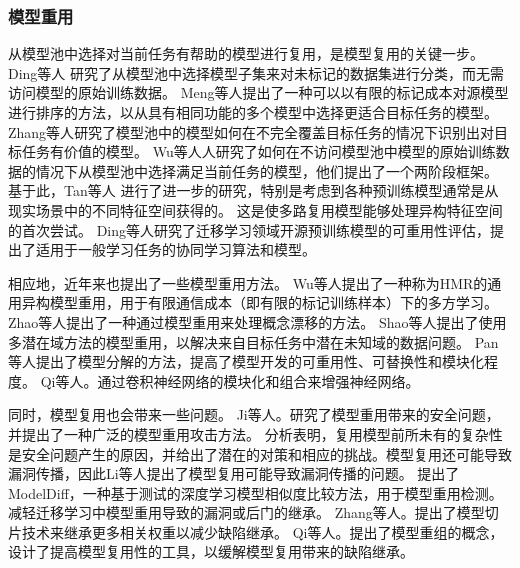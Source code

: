 \documentclass[fontset=macnew,UTF8]{article} %
\begin{document}
\subsubsection{模型重用}
 从模型池中选择对当前任务有帮助的模型进行复用，是模型复用的关键一步。 Ding等人\cite{ding2020boosting} 研究了从模型池中选择模型子集来对未标记的数据集进行分类，而无需访问模型的原始训练数据。 Meng等人\cite{meng2021measuring}提出了一种可以以有限的标记成本对源模型进行排序的方法，以从具有相同功能的多个模型中选择更适合目标任务的模型。Zhang等人\cite{zhang2021towards}研究了模型池中的模型如何在不完全覆盖目标任务的情况下识别出对目标任务有价值的模型。 Wu等人\cite{wu2021model}人研究了如何在不访问模型池中模型的原始训练数据的情况下从模型池中选择满足当前任务的模型，他们提出了一个两阶段框架。 基于此，Tan等人\cite{tan2022towards} 进行了进一步的研究，特别是考虑到各种预训练模型通常是从现实场景中的不同特征空间获得的。 这是使多路复用模型能够处理异构特征空间的首次尝试。 Ding等人\cite{ding2022pre}研究了迁移学习领域开源预训练模型的可重用性评估，提出了适用于一般学习任务的协同学习算法和模型。

相应地，近年来也提出了一些模型重用方法。 Wu等人\cite{wu2019heterogeneous}提出了一种称为HMR的通用异构模型重用，用于有限通信成本（即有限的标记训练样本）下的多方学习。 Zhao等人\cite{zhao2020handling}提出了一种通过模型重用来处理概念漂移的方法。 Shao等人\cite{shao2021towards}提出了使用多潜在域方法的模型重用，以解决来自目标任务中潜在未知域的数据问题。 Pan等人\cite{pan2022decomposing}提出了模型分解的方法，提高了模型开发的可重用性、可替换性和模块化程度。 Qi等人\cite{qi2022patching}。通过卷积神经网络的模块化和组合来增强神经网络。

同时，模型复用也会带来一些问题。 Ji等人\cite{ji2018model}。研究了模型重用带来的安全问题，并提出了一种广泛的模型重用攻击方法。 分析表明，复用模型前所未有的复杂性是安全问题产生的原因，并给出了潜在的对策和相应的挑战。模型复用还可能导致漏洞传播，因此Li等人提出了模型复用可能导致漏洞传播的问题。 \cite{li2021modeldiff}提出了ModelDiff，一种基于测试的深度学习模型相似度比较方法，用于模型重用检测。 减轻迁移学习中模型重用导致的漏洞或后门的继承。 Zhang等人\cite{zhang2022remos}。提出了模型切片技术来继承更多相关权重以减少缺陷继承。 Qi\cite{qi2023reusing}等人。提出了模型重组的概念，设计了提高模型复用性的工具，以缓解模型复用带来的缺陷继承。
\end{document}
